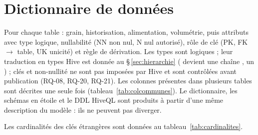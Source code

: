 \chapter{Dictionnaire de données}\label{sec:dictionnaire}
Pour chaque table : grain, historisation, alimentation, volumétrie, puis attributs avec type logique, nullabilité (NN non nul, N nul autorisé), rôle de clé (PK, FK $\rightarrow$ table, UK unicité) et règle de dérivation. Les types sont logiques ; leur traduction en types Hive est donnée au §\,\ref{sec:hierarchie} ( devient une chaîne ,  un ) ; clés et non-nullité ne sont pas imposées par Hive et sont contrôlées avant publication (RQ-08, RQ-20, RQ-21). Les colonnes présentes dans plusieurs tables sont décrites une seule fois (tableau~\ref{tab:colcommunes}). Le dictionnaire, les schémas en étoile et le DDL HiveQL sont produits à partir d'une même description du modèle : ils ne peuvent pas diverger.

Les cardinalités des clés étrangères sont données au tableau~\ref{tab:cardinalites}.

\begin{table}[!htbp]
\caption{Colonnes communes}\label{tab:colcommunes}

\end{table}


